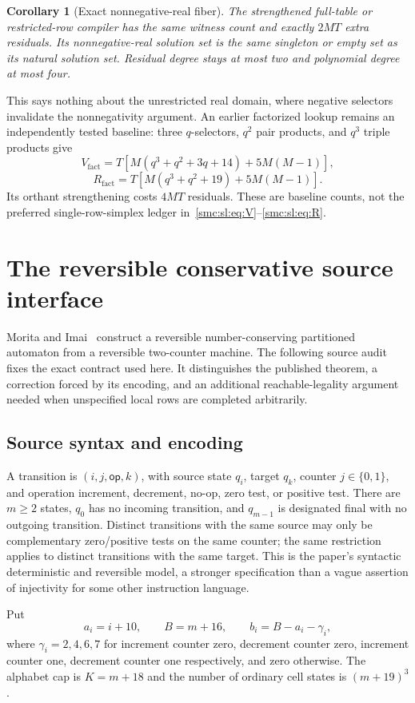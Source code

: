 \documentclass[11pt,letterpaper]{article}
\numberwithin{equation}{section}
\newtheorem{corollary}[theorem]{Corollary}
\theoremstyle{definition}
\theoremstyle{remark}
\begin{document}
\begin{corollary}[Exact nonnegative-real fiber]
The strengthened full-table or restricted-row compiler has the same witness count and exactly $2MT$ extra residuals. Its nonnegative-real solution set is the same singleton or empty set as its natural solution set. Residual degree stays at most two and polynomial degree at most four.
\end{corollary}

This says nothing about the unrestricted real domain, where negative selectors invalidate the nonnegativity argument. An earlier factorized lookup remains an independently tested baseline: three $q$-selectors, $q^2$ pair products, and $q^3$ triple products give
\[
 V_{\mathrm{fact}}=T[M(q^3+q^2+3q+14)+5M(M-1)],
\]
\[
 R_{\mathrm{fact}}=T[M(q^3+q^2+19)+5M(M-1)].
\]
Its orthant strengthening costs $4MT$ residuals. These are baseline counts, not the preferred single-row-simplex ledger in~\eqref{smc:sl:eq:V}--\eqref{smc:sl:eq:R}.
\section{The reversible conservative source interface}\label{smc:sl:sec:source}
Morita and Imai~\cite{moritaimai} construct a reversible number-conserving partitioned automaton from a reversible two-counter machine. The following source audit fixes the exact contract used here. It distinguishes the published theorem, a correction forced by its encoding, and an additional reachable-legality argument needed when unspecified local rows are completed arbitrarily.

\subsection{Source syntax and encoding}
A transition is $(i,j,\mathsf{op},k)$, with source state $q_i$, target $q_k$, counter $j\in\{0,1\}$, and operation increment, decrement, no-op, zero test, or positive test. There are $m\ge2$ states, $q_0$ has no incoming transition, and $q_{m-1}$ is designated final with no outgoing transition. Distinct transitions with the same source may only be complementary zero/positive tests on the same counter; the same restriction applies to distinct transitions with the same target. This is the paper's syntactic deterministic and reversible model, a stronger specification than a vague assertion of injectivity for some other instruction language.

Put
\[
 a_i=i+10,\qquad B=m+16,\qquad b_i=B-a_i-\gamma_i,
\]
where $\gamma_i=2,4,6,7$ for increment counter zero, decrement counter zero, increment counter one, decrement counter one respectively, and zero otherwise. The alphabet cap is $K=m+18$ and the number of ordinary cell states is $(m+19)^3$.
\end{document}
